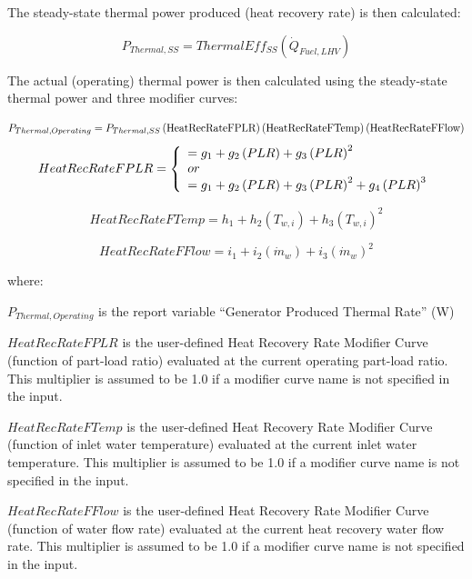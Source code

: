 The steady-state thermal power produced (heat recovery rate) is then calculated:

\begin{equation}
{P_{Thermal,SS}} = ThermalEf{f_{SS}}\left( {{{\dot Q}_{Fuel,LHV}}} \right)
\end{equation}

The actual (operating) thermal power is then calculated using the steady-state thermal power and three modifier curves:

\begin{equation}
  P_{Thermal,Operating} = P_{Thermal,SS} \left(\text{HeatRecRateFPLR}\right) \left(\text{HeatRecRateFTemp}\right) \left(\text{HeatRecRateFFlow}\right)
\end{equation}
\begin{equation}
HeatRecRateFPLR = \left\{
  \begin{array}{l}
    = g_1 + g_2 \left(PLR\right) + g_3 \left(PLR\right)^2  \\
    or \\
    = g_1 + g_2 \left(PLR\right) + g_3 \left(PLR\right)^2 + g_4 \left(PLR\right)^3
  \end{array}
\right.
\end{equation}

\begin{equation}
HeatRecRateFTemp = {h_1} + {h_2}\left( {{T_{w,i}}} \right) + {h_3}{\left( {{T_{w,i}}} \right)^2}
\end{equation}

\begin{equation}
HeatRecRateFFlow = {i_1} + {i_2}\left( {{{\dot m}_w}} \right) + {i_3}{\left( {{{\dot m}_w}} \right)^2}
\end{equation}

where:

\({P_{Thermal,Operating}}\) is the report variable ``Generator Produced Thermal Rate'' (W)

\(HeatRecRateFPLR\) is the user-defined Heat Recovery Rate Modifier Curve (function of part-load ratio) evaluated at the current operating part-load ratio. This multiplier is assumed to be 1.0 if a modifier curve name is not specified in the input.

\(HeatRecRateFTemp\) is the user-defined Heat Recovery Rate Modifier Curve (function of inlet water temperature) evaluated at the current inlet water temperature. This multiplier is assumed to be 1.0 if a modifier curve name is not specified in the input.

\(HeatRecRateFFlow\) is the user-defined Heat Recovery Rate Modifier Curve (function of water flow rate) evaluated at the current heat recovery water flow rate. This multiplier is assumed to be 1.0 if a modifier curve name is not specified in the input.

